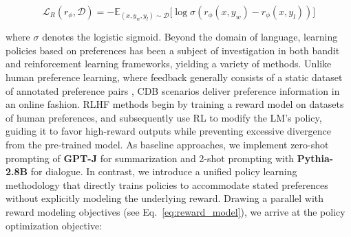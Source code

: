 \begin{equation}\label{eq:reward_model}
    \mathcal{L}_R(r_{\phi}, \mathcal{D}) = -\mathbb{E}_{(x, y_w, y_l)\sim \mathcal{D}}\bigl[\log \sigma(r_{\phi}(x, y_w)- r_{\phi}(x, y_l))\bigr]
\end{equation}

where $\sigma$ denotes the logistic sigmoid. Beyond the domain of language, learning policies based on preferences has been a subject of investigation in both bandit and reinforcement learning frameworks, yielding a variety of methods. Unlike human preference learning, where feedback generally consists of a static dataset of annotated preference pairs \citep{yan2022human}, CDB scenarios deliver preference information in an online fashion. RLHF methods begin by training a reward model on datasets of human preferences, and subsequently use RL to modify the LM’s policy, guiding it to favor high-reward outputs while preventing excessive divergence from the pre-trained model. As baseline approaches, we implement zero-shot prompting of \textbf{GPT-J} \citep{gpt-j} for summarization and 2-shot prompting with \textbf{Pythia-2.8B} \citep{biderman2023pythia} for dialogue. In contrast, we introduce a unified policy learning methodology that directly trains policies to accommodate stated preferences without explicitly modeling the underlying reward. Drawing a parallel with reward modeling objectives (see Eq.~\ref{eq:reward_model}), we arrive at the policy optimization objective:

